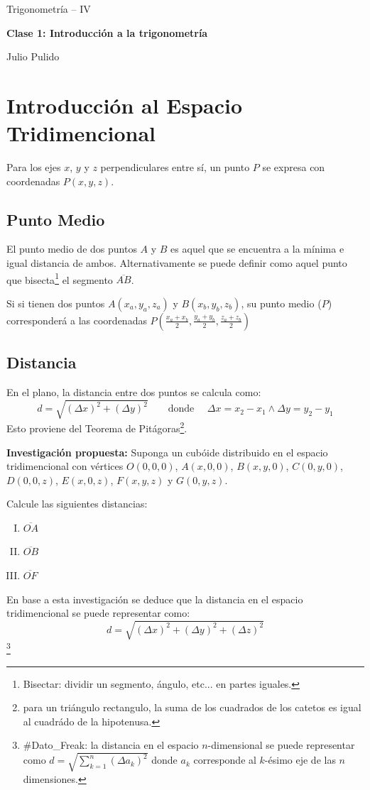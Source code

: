 \documentclass[spanish,12pt]{article}
\begin{document}
	\begin{titlepage}
	\begin{center}
	\hspace{0pt}
	\vfill
	Trigonometría – IV
	\medskip
	
	{\Large\textbf{{Clase 1: Introducción a la trigonometría}}}
	
	\medskip
	Julio Pulido
	\thispagestyle{empty}
	\vfill
	\end{center}
	\end{titlepage}
\newpage
\section{Introducción al Espacio Tridimencional}

Para los ejes $x$, $y$ y $z$ perpendiculares entre sí, un punto $P$ se expresa con coordenadas $P(x,y,z)$.

\subsection{Punto Medio}

El punto medio de dos puntos $A$ y $B$ es aquel que se encuentra a la mínima e igual distancia de ambos. Alternativamente se puede definir como aquel punto que bisecta\footnote{Bisectar: dividir un segmento, ángulo, etc... en partes iguales.} el segmento $\overline{AB}$.

Si si tienen dos puntos $A(x_a,y_a,z_a)$ y $B(x_b,y_b,z_b)$, su punto medio ($P$) corresponderá a las coordenadas $P\left(\frac{x_a+x_b}{2},\frac{y_a+y_b}{2},\frac{z_a+z_b}{2}\right)$
\newpage
\subsection{Distancia}
En el plano, la distancia entre dos puntos se calcula como:
$$d=\sqrt{(\Delta x)^2+(\Delta y)^2}\quad\quad \text{donde }\quad\Delta x=x_2-x_1 \wedge \Delta y=y_2-y_1$$
Esto proviene del Teorema de Pitágoras\footnote{para un triángulo rectangulo, la suma de los cuadrados de los catetos es igual al cuadrádo de la hipotenusa.}.

\textbf{Investigación propuesta:} Suponga un cubóide distribuido en el espacio tridimencional con vértices $O(0,0,0)$, $A(x,0,0)$, $B(x,y,0)$, $C(0,y,0)$, $D(0,0,z)$, $E(x,0,z)$, $F(x,y,z)$ y $G(0,y,z)$.

Calcule las siguientes distancias:
\begin{enumerate}[I)]
    \item $\overline{OA}$
    \item $\overline{OB}$
    \item $\overline{OF}$
\end{enumerate}
\newpage
En base a esta investigación se deduce que la distancia en el espacio tridimencional se puede representar como:
$$d=\sqrt{(\Delta x)^2+(\Delta y)^2+(\Delta z)^2}$$\footnote{\#Dato\_Freak: la distancia en el espacio $n$-dimensional se puede representar como $d=\sqrt{\sum\limits_{k=1}^{n}(\Delta a_k)^2}$ donde $a_k$ corresponde al $k$-ésimo eje de las $n$ dimensiones.}
\newpage
\end{document}
